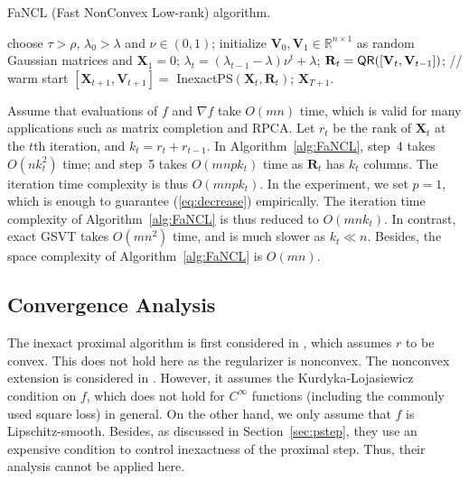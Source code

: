 \documentclass[10pt,journal,compsoc]{IEEEtran}
\def \R{\mathbb R}
\newcommand{\X}{\mathbf{X}}
\newcommand{\QR}[1]{\text{\sf QR}( #1 )}
\begin{document}
\begin{algorithm}[ht]
\caption{\textsf{FaNCL} \!\! (Fast \! NonConvex Low-rank) \!\! algorithm.}
\begin{algorithmic}[1]
	\REQUIRE choose $\tau > \rho$, $\lambda_0 > \lambda$ and $\nu \in (0,1)$;
	\STATE initialize $\mathbf{V}_0, \mathbf{V}_1 \in \R^{n \times 1}$ as random Gaussian matrices and $\X_1 = 0$;
	\STATE $\lambda_t = (\lambda_{t-1} -\lambda) \nu^t + \lambda$;
	\STATE $\mathbf{R}_t = \QR{[\mathbf{V}_t, \mathbf{V}_{t - 1}]}$; // warm start
	\STATE $[\X_{t + 1}, \mathbf{V}_{t + 1}] =$ \textsf{InexactPS}$(\X_t, \mathbf{R}_t)$;
	\ENDFOR 
	\RETURN $\X_{T + 1}$.
\end{algorithmic}
\label{alg:FaNCL}
\end{algorithm}

Assume that evaluations of $f$ and $\nabla f$ take 
$O(m n)$ time,
which is valid for many applications such as matrix completion and RPCA.
Let $r_t$ be the rank of $\X_t$ at the $t$th iteration, and $k_t = r_t + r_{t - 1}$.  In
Algorithm~\ref{alg:FaNCL}, step~4 takes $O(n k_t^2)$ time; and step~5 takes $O(m n p k_t)$ time
as $\mathbf{R}_t$ has $k_t$ columns.
The iteration time complexity 
is 
thus
$O(m n p k_t)$.
In the experiment, we set $p = 1$,
which is 
enough to guarantee (\ref{eq:decrease})
empirically.
The iteration time complexity 
	of Algorithm~\ref{alg:FaNCL} is thus reduced to
	$O( m n k_t )$.
In contrast, exact GSVT takes $O(m n^2)$ time, and is much slower as $k_t \ll n$.
Besides,
	the space complexity of
	Algorithm~\ref{alg:FaNCL} is $O( m n )$.

\subsection{Convergence Analysis}
\label{sec:convana}

The inexact proximal algorithm is first considered in
\cite{schmidt2011convergence}, which assumes $r$ to be convex.
This does not hold here as the regularizer is nonconvex.
The nonconvex
extension is considered in \cite{attouch2013convergence}.  However, 
it assumes the Kurdyka-Lojasiewicz condition  \cite{bolte2010characterizations} 
on $f$, which
does not hold
for $C^{\infty}$ functions
(including the commonly used square loss)
in general.
On the other hand,
we only assume that $f$ is Lipschitz-smooth.
Besides,
as discussed in Section~\ref{sec:pstep},
they use an 
expensive
condition to control inexactness of the proximal step.
Thus, their analysis cannot 
be applied here.  
\end{document}
